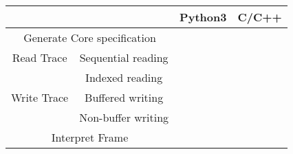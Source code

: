 \begin{tabular}{|cc|c|c|}
	\hline
	\multicolumn{2}{|c|}{}                                                  & Python3               & C/C++                 \\ \hline
	\multicolumn{2}{|c|}{Generate Core specification}                       & \cmark &\xmark \\ \hline
	\multicolumn{1}{|c|}{{Read Trace}}  & Sequential reading & \cmark & \cmark \\ \cline{2-4} 
	\multicolumn{1}{|c|}{}                             & Indexed reading    &\xmark & \cmark \\ \hline
	\multicolumn{1}{|c|}{{Write Trace}} & Buffered writing   &\xmark & \cmark \\ \cline{2-4} 
	\multicolumn{1}{|c|}{}                             & Non-buffer writing &\xmark & \cmark \\ \hline
	\multicolumn{2}{|c|}{Interpret Frame}                                   & \cmark & \cmark \\ \hline
\end{tabular}